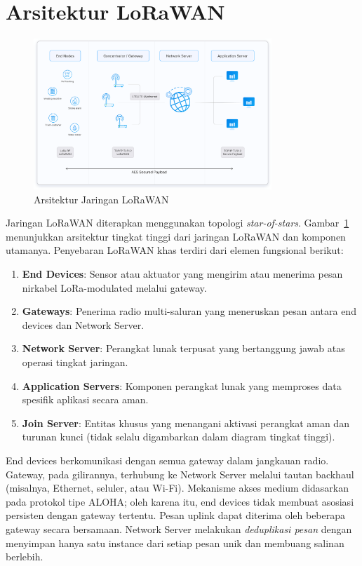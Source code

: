 \section{Arsitektur LoRaWAN}
\begin{figure}
    \centering
    \includegraphics[width=0.8\textwidth]{figures/architecture_ttn.png}
    \caption{Arsitektur Jaringan LoRaWAN}
    \label{fig:lora_architecture}
\end{figure}
Jaringan LoRaWAN diterapkan menggunakan topologi \emph{star-of-stars}.
Gambar~\ref{fig:lora_architecture} menunjukkan arsitektur tingkat tinggi dari jaringan LoRaWAN dan komponen utamanya.
Penyebaran LoRaWAN khas terdiri dari elemen fungsional berikut:
\begin{enumerate}
    \item \textbf{End Devices}: Sensor atau aktuator yang mengirim atau menerima pesan nirkabel LoRa-modulated melalui gateway.
    \item \textbf{Gateways}: Penerima radio multi-saluran yang meneruskan pesan antara end devices dan Network Server.
    \item \textbf{Network Server}: Perangkat lunak terpusat yang bertanggung jawab atas operasi tingkat jaringan.
    \item \textbf{Application Servers}: Komponen perangkat lunak yang memproses data spesifik aplikasi secara aman.
    \item \textbf{Join Server}: Entitas khusus yang menangani aktivasi perangkat aman dan turunan kunci (tidak selalu digambarkan dalam diagram tingkat tinggi).
\end{enumerate}
End devices berkomunikasi dengan semua gateway dalam jangkauan radio. Gateway, pada gilirannya, terhubung ke Network Server melalui tautan backhaul (misalnya, Ethernet, seluler, atau Wi-Fi). Mekanisme akses medium didasarkan pada protokol tipe ALOHA; oleh karena itu, end devices tidak membuat asosiasi persisten dengan gateway tertentu. Pesan uplink dapat diterima oleh beberapa gateway secara bersamaan. Network Server melakukan \emph{deduplikasi pesan} dengan menyimpan hanya satu instance dari setiap pesan unik dan membuang salinan berlebih.
